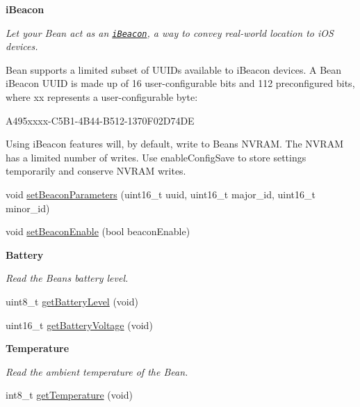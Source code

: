 \begin{Indent}{\bf i\+Beacon}\par
{\em Let your Bean act as an \href{https://developer.apple.com/ibeacon/}{\tt i\+Beacon}, a way to convey real-\/world location to i\+OS devices.

Bean supports a limited subset of U\+U\+I\+Ds available to i\+Beacon devices. A Bean i\+Beacon U\+U\+ID is made up of 16 user-\/configurable bits and 112 preconfigured bits, where {\ttfamily xx} represents a user-\/configurable byte\+:

{\ttfamily A495xxxx-\/\+C5\+B1-\/4\+B44-\/\+B512-\/1370\+F02\+D74\+DE}

Using i\+Beacon features will, by default, write to Bean\textquotesingle{}s N\+V\+R\+AM. The N\+V\+R\+AM has a limited number of writes. Use {\ttfamily enable\+Config\+Save} to store settings temporarily and conserve N\+V\+R\+AM writes. }\begin{DoxyCompactItemize}
\item 
void \hyperlink{class_bean_class_a3b78a7b755cda9f066104f339638d69c}{set\+Beacon\+Parameters} (uint16\+\_\+t uuid, uint16\+\_\+t major\+\_\+id, uint16\+\_\+t minor\+\_\+id)
\item 
void \hyperlink{class_bean_class_a354e2ff36d0e101b35255bae0a5e33ca}{set\+Beacon\+Enable} (bool beacon\+Enable)
\end{DoxyCompactItemize}
\end{Indent}
\begin{Indent}{\bf Battery}\par
{\em Read the Bean\textquotesingle{}s battery level. }\begin{DoxyCompactItemize}
\item 
uint8\+\_\+t \hyperlink{class_bean_class_ac21fd79279f5e25c37609ff15e53cea1}{get\+Battery\+Level} (void)
\item 
uint16\+\_\+t \hyperlink{class_bean_class_a862784d57eca8dd368172612e5e792de}{get\+Battery\+Voltage} (void)
\end{DoxyCompactItemize}
\end{Indent}
\begin{Indent}{\bf Temperature}\par
{\em Read the ambient temperature of the Bean. }\begin{DoxyCompactItemize}
\item 
int8\+\_\+t \hyperlink{class_bean_class_a711e837c145b51a8e95aa22a3fc9bcf9}{get\+Temperature} (void)
\end{DoxyCompactItemize}
\end{Indent}
